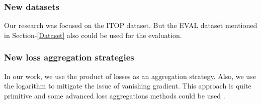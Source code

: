 \subsubsection{New datasets}
Our research was focused on the ITOP dataset. But the EVAL dataset mentioned in Section-\ref{Dataset} also could be used for the evaluation. 

\subsubsection{New loss aggregation strategies}
In our work, we use the product of losses as an aggregation strategy. Also, we use the logarithm to mitigate the issue of vanishing gradient. This approach is quite primitive and some advanced loss aggregations methods could be used \parencite{noauthor_optimizing_nodate}.